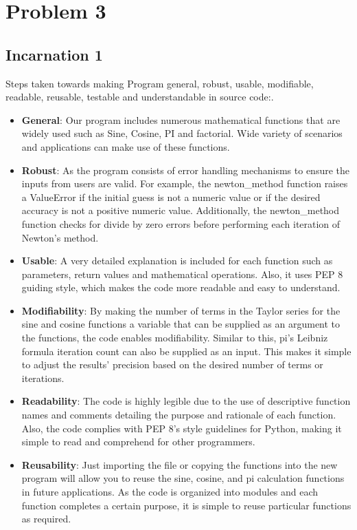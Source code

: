 \chapter{Problem 3}
\section{Incarnation 1}
Steps taken towards making Program general, robust, usable, modifiable, readable, reusable, testable and understandable in source code:.
\begin{itemize}
    \item \textbf{General}: Our program includes numerous mathematical functions that are widely used such as Sine, Cosine, PI and factorial. Wide variety of scenarios and applications can make use of these functions.

     \item \textbf{Robust}: As the program consists of error handling mechanisms to ensure the inputs from users are valid.  For example, the newton\_method function raises a ValueError if the initial guess is not a numeric value or if the desired accuracy is not a positive numeric value. Additionally, the newton\_method function checks for divide by zero errors before performing each iteration of Newton's method.

     \item \textbf{Usable}: A very detailed explanation is included for each function such as parameters, return values and mathematical operations. Also, it uses PEP 8 guiding style, which makes the code more readable and easy to understand.

     \item \textbf{Modifiability}: By making the number of terms in the Taylor series for the sine and cosine functions a variable that can be supplied as an argument to the functions, the code enables modifiability. Similar to this, pi's Leibniz formula iteration count can also be supplied as an input. This makes it simple to adjust the results' precision based on the desired number of terms or iterations.

     \item \textbf{Readability}: The code is highly legible due to the use of descriptive function names and comments detailing the purpose and rationale of each function. Also, the code complies with PEP 8's style guidelines for Python, making it simple to read and comprehend for other programmers.

     \item \textbf{Reusability}: Just importing the file or copying the functions into the new program will allow you to reuse the sine, cosine, and pi calculation functions in future applications. As the code is organized into modules and each function completes a certain purpose, it is simple to reuse particular functions as required.


\end{itemize}
